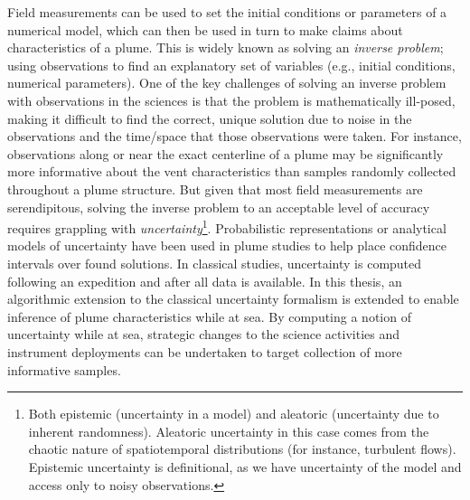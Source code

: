 Field measurements can be used to set the initial conditions or parameters of a numerical model, which can then be used in turn to make claims about characteristics of a plume.
This is widely known as solving an \emph{inverse problem}; using observations to find an explanatory set of variables (e.g., initial conditions, numerical parameters).
One of the key challenges of solving an inverse problem with observations in the sciences is that the problem is mathematically ill-posed, making it difficult to find the correct, unique solution due to noise in the observations and the time/space that those observations were taken.
For instance, observations along or near the exact centerline of a plume may be significantly more informative about the vent characteristics\autocite{bangian2022solution} than samples randomly collected throughout a plume structure\autocite{baker1998rise}.
But given that most field measurements are serendipitous, solving the inverse problem to an acceptable level of accuracy requires grappling with \emph{uncertainty}\footnote{Both epistemic (uncertainty in a model) and aleatoric (uncertainty due to inherent randomness). Aleatoric uncertainty in this case comes from the chaotic nature of spatiotemporal distributions (for instance, turbulent flows). Epistemic uncertainty is definitional, as we have uncertainty of the model and access only to noisy observations.}.
Probabilistic representations or analytical models of uncertainty have been used in plume studies to help place confidence intervals over found solutions\autocite{bemis1993geothermal,sohn2019observations}.
In classical studies, uncertainty is computed following an expedition and after all data is available.
In this thesis, an algorithmic extension to the classical uncertainty formalism is extended to enable inference of plume characteristics while at sea.
By computing a notion of uncertainty while at sea, strategic changes to the science activities and instrument deployments can be undertaken to target collection of more informative samples.




